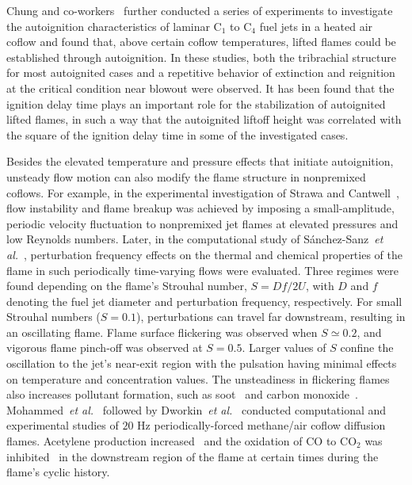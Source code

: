 Chung and co-workers~\cite{choi09,choi10,choi12} further conducted a series of experiments to investigate the autoignition characteristics of laminar C$_1$ to C$_4$ fuel jets in a heated air coflow and found that, above certain coflow temperatures, lifted flames could be established through autoignition.  In these studies, both the tribrachial structure for most autoignited cases and a repetitive behavior of extinction and reignition at the critical condition near blowout were observed.  It has been found that the ignition delay time plays an important role for the stabilization of autoignited lifted flames, in such a way that the autoignited liftoff height was correlated with the square of the ignition delay time in some of the investigated cases.

Besides the elevated temperature and pressure effects that initiate autoignition, unsteady flow motion can also modify the flame structure in nonpremixed coflows.  For example, in the experimental investigation of Strawa and Cantwell~\cite{strawa89}, flow instability and flame breakup was achieved by imposing a small-amplitude, periodic velocity fluctuation to nonpremixed jet flames at elevated pressures and low Reynolds numbers.  Later, in the computational study of S\'{a}nchez-Sanz~\emph{et al.}~\cite{sanchezsanz10}, perturbation frequency effects on the thermal and chemical properties of the flame in such periodically time-varying flows were evaluated.  Three regimes were found depending on the flame's Strouhal number, $S = Df/2U$, with $D$ and $f$ denoting the fuel jet diameter and perturbation frequency, respectively.  For small Strouhal numbers ($S = 0.1$), perturbations can travel far downstream, resulting in an oscillating flame.  Flame surface flickering was observed when $S\simeq 0.2$, and vigorous flame pinch-off was observed at $S = 0.5$.  Larger values of $S$ confine the oscillation to the jet's near-exit region with the pulsation having minimal effects on temperature and concentration values.  The unsteadiness in flickering flames also increases pollutant formation, such as soot~\cite{shaddix94} and carbon monoxide~\cite{skaggs96}.  Mohammed~\emph{et al.}~\cite{mohammed98} followed by Dworkin~\emph{et al.}~\cite{dworkin07} conducted computational and experimental studies of $20$ Hz periodically-forced methane/air coflow diffusion flames.  Acetylene production increased~\cite{mohammed98} and the oxidation of CO to CO$_2$ was inhibited~\cite{dworkin07} in the downstream region of the flame at certain times during the flame's cyclic history. 

